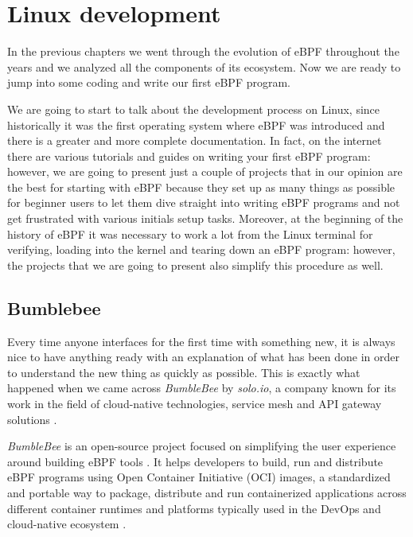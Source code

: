 \chapter{Linux development}

In the previous chapters we went through the evolution of eBPF throughout the years and we analyzed all the components of its ecosystem.
Now we are ready to jump into some coding and write our first eBPF program.

We are going to start to talk about the development process on Linux, since historically it was the first operating system where eBPF was introduced and there is a greater and more complete documentation.
In fact, on the internet there are various tutorials and guides on writing your first eBPF program: however, we are going to present just a couple of projects that in our opinion are the best for starting with eBPF because they set up as many things as possible for beginner users to let them dive straight into writing eBPF programs and not get frustrated with various initials setup tasks.
Moreover, at the beginning of the history of eBPF it was necessary to work a lot from the Linux terminal for verifying, loading into the kernel and tearing down an eBPF program: however, the projects that we are going to present also simplify this procedure as well.

\section{Bumblebee}

Every time anyone interfaces for the first time with something new, it is always nice to have anything ready with an explanation of what has been done in order to understand the new thing as quickly as possible.
This is exactly what happened when we came across \textit{BumbleBee} \cite{BumbleBeeWebsite} by \textit{solo.io}, a company known for its work in the field of cloud-native technologies, service mesh and API gateway solutions \cite{soloioWebsite}.

\textit{BumbleBee} is an open-source project focused on simplifying the user experience around building eBPF tools \cite{BumbleBeeRepo}. 
It helps developers to build, run and distribute eBPF programs using Open Container Initiative (OCI) images, a standardized and portable way to package, distribute and run containerized applications across different container runtimes and platforms typically used in the DevOps and cloud-native ecosystem \cite{OCIRepo}.


